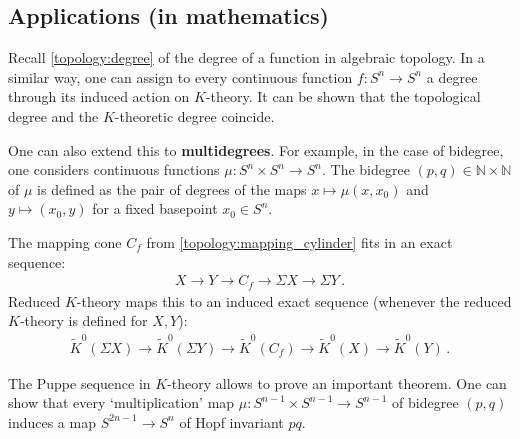 \subsection{Applications (in mathematics)}

    \begin{property}[Degree]
        Recall \cref{topology:degree} of the degree of a function in algebraic topology. In a similar way, one can assign to every continuous function $f:S^n\rightarrow S^n$ a degree through its induced action on $K$-theory. It can be shown that the topological degree and the $K$-theoretic degree coincide.

        One can also extend this to \textbf{multidegrees}. For example, in the case of bidegree, one considers continuous functions $\mu:S^n\times S^n\rightarrow S^n$. The bidegree $(p,q)\in\mathbb{N}\times\mathbb{N}$ of $\mu$ is defined as the pair of degrees of the maps $x\mapsto\mu(x,x_0)$ and $y\mapsto(x_0,y)$ for a fixed basepoint $x_0\in S^n$.
    \end{property}


    \begin{property}
        The mapping cone $C_f$ from \cref{topology:mapping_cylinder} fits in an exact sequence:
        \begin{gather}
            X\longrightarrow Y\longrightarrow C_f\longrightarrow\Sigma X\longrightarrow\Sigma Y\,.
        \end{gather}
        Reduced $K$-theory maps this to an induced exact sequence (whenever the reduced $K$-theory is defined for $X,Y$):
        \begin{gather}
            \widetilde{K}^0(\Sigma X)\longrightarrow\widetilde{K}^0(\Sigma Y)\longrightarrow \widetilde{K}^0(C_f)\longrightarrow\widetilde{K}^0(X)\longrightarrow\widetilde{K}^0(Y)\,.
        \end{gather}
    \end{property}
    The Puppe sequence in $K$-theory allows to prove an important theorem.
     One can show that every `multiplication' map $\mu:S^{n-1}\times S^{n-1}\rightarrow S^{n-1}$ of bidegree $(p,q)$ induces a map $S^{2n-1}\rightarrow S^n$ of Hopf invariant $pq$.

